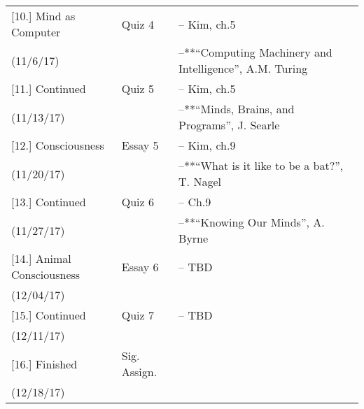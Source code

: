 \documentclass[article,oneside]{memoir}
\begin{document}
\begin{center}
\begin{longtable}{p{4.5cm}p{2cm}p{6cm}}
[10.] Mind as Computer		& Quiz 4			&  -- Kim, ch.5\\
(11/6/17)		            	&		      			& --**``Computing Machinery and Intelligence'', A.M. Turing  \\  [1.8\baselineskip]

[11.] Continued			    	& Quiz 5			& -- Kim, ch.5 \\
(11/13/17)				        &		    		& --**``Minds, Brains, and Programs'', J.  Searle \\ [1.8\baselineskip]
						
[12.] Consciousness		 	& Essay 5			& -- Kim, ch.9 \\
(11/20/17)				      	&			      	& --**``What is it like to be a bat?'', T. Nagel \\ [1.8\baselineskip]
 
[13.] Continued 	    		& Quiz 6			& -- Ch.9\\
(11/27/17)			      		&			      	& --**``Knowing Our Minds'', A. Byrne  \\ [1.8\baselineskip]

[14.] Animal Consciousness  	 & Essay 6		& -- TBD \\
(12/04/17)				      	&		      		&  \\ [1.8\baselineskip]

[15.] Continued		    		& Quiz 7			& -- TBD \\ 
(12/11/17)				      	&			       	& \\

[16.] Finished		    		& Sig. Assign.		&  \\ 
(12/18/17)				      	&			       	& \\


\end{longtable}
\end{center}
\end{document}
